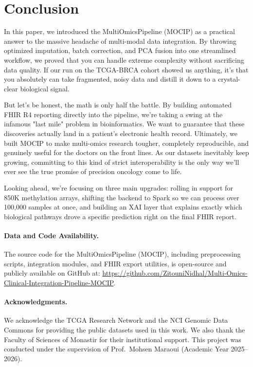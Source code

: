 \documentclass[conference,flushend]{iaria} %
\begin{document}
\section{Conclusion}

In this paper, we introduced the MultiOmicsPipeline (MOCIP) as a practical answer to the massive headache of multi-modal data integration. By throwing optimized imputation, batch correction, and PCA fusion into one streamlined workflow, we proved that you can handle extreme complexity without sacrificing data quality. If our run on the TCGA-BRCA cohort showed us anything, it's that you absolutely can take fragmented, noisy data and distill it down to a crystal-clear biological signal.

But let's be honest, the math is only half the battle. By building automated FHIR R4 reporting directly into the pipeline, we're taking a swing at the infamous "last mile" problem in bioinformatics. We want to guarantee that these discoveries actually land in a patient's electronic health record. Ultimately, we built MOCIP to make multi-omics research tougher, completely reproducible, and genuinely useful for the doctors on the front lines. As our datasets inevitably keep growing, committing to this kind of strict interoperability is the only way we'll ever see the true promise of precision oncology come to life.

Looking ahead, we're focusing on three main upgrades: rolling in support for 850K methylation arrays, shifting the backend to Spark so we can process over 100,000 samples at once, and building an XAI layer that explains exactly which biological pathways drove a specific prediction right on the final FHIR report.

\paragraph{Data and Code Availability.}
{\sloppy
The source code for the MultiOmicsPipeline (MOCIP), including preprocessing scripts, integration modules, and FHIR export utilities, is open-source and publicly available on GitHub at: \url{https://github.com/ZitouniNidhal/Multi-Omics-Clinical-Integration-Pipeline-MOCIP}.
}

\paragraph{Acknowledgments.}
\noindent We acknowledge the TCGA Research Network and the NCI Genomic Data Commons for providing the public datasets used in this work. We also thank the Faculty of Sciences of Monastir for their institutional support. This project was conducted under the supervision of Prof.\ Mohsen Maraoui (Academic Year 2025--2026).

\label{page:before_refs}

\printbibliography
\end{document}
